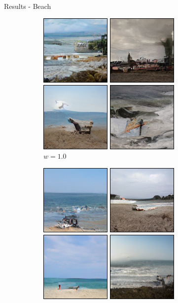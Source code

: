 \documentclass[11pt]{beamer}
\begin{document}
  \begin{frame}{Results - Beach}
    \begin{figure}
      \centering
      \begin{subfigure}[b]{0.24\textwidth}
        \includegraphics[width=\linewidth]{figures/a_beach_1.png}
        \caption{$w=1.0$}
      \end{subfigure}
      \begin{subfigure}[b]{0.24\textwidth}
        \includegraphics[width=\linewidth]{figures/a_beach_3.png}

\end{subfigure}
\end{figure}
\end{frame}
\end{document}
